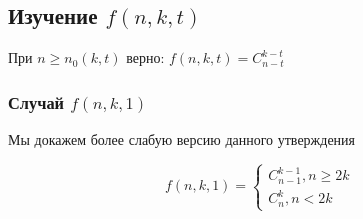 

\subsection{Изучение \(f(n, k, t)\)}
\begin{theorem}
    При \(n \ge n_0(k, t)\) верно: \(f(n, k, t) = C_{n - t}^{k - t}\)
\end{theorem}

\subsubsection{Случай \(f(n, k, 1)\)}
Мы докажем более слабую версию данного утверждения
\begin{proposition}
    \[f(n, k, 1) = \left\{\begin{array}{l}
        C_{n - 1}^{k - 1}, n \ge 2k \\
        C_n^k, n < 2k
    \end{array}\right.\]
\end{proposition}
